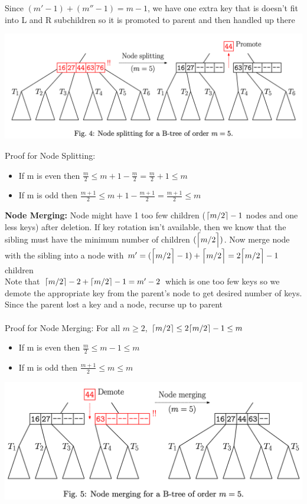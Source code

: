 \documentclass{article}
\DeclarePairedDelimiter{\ceil}{\lceil}{\rceil}
\begin{document}
  Since $(m' - 1) + (m'' - 1) = m - 1$, we have one extra key that is doesn't fit into L and R subchildren so it is promoted to parent and then handled up there
  \begin{center}
  \includegraphics[scale=0.15]{BTreeNodeSplitting}
  \end{center}
  Proof for Node Splitting:
  \begin{itemize}[noitemsep]
  \item If m is even then $\frac{m}{2} \leq m + 1 - \frac{m}{2} = \frac{m}{2} + 1 \leq m$
  \item If m is odd then $\frac{m+1}{2} \leq m + 1 - \frac{m+1}{2} = \frac{m+1}{2} \leq m$ \\
  \end{itemize}
  \textbf{Node Merging: }Node might have 1 too few children ($\ceil{m/2} - 1$ nodes and one less keys) after deletion. If key rotation isn't available, then we know that the sibling must have the minimum number of children $(\ceil[\Big]{m/2})$. Now merge node with the sibling into a node with $m' = (\ceil[\Big]{m/2} - 1) + \ceil[\Big]{m/2} = 2\ceil[\Big]{m/2} - 1$ children\\
  Note that $\ceil{m/2} - 2 + \ceil{m/2} - 1 = m' - 2$ which is one too few keys so we demote the appropriate key from the parent's node to get desired number of keys. \\
  Since the parent lost a key and a node, recurse up to parent\\ \\
  Proof for Node Merging: For all $m \geq 2$, $\ceil{m/2} \leq 2\ceil{m/2} - 1 \leq m$
  \begin{itemize}[noitemsep]
  \item If m is even then $\frac{m}{2} \leq m - 1 \leq m$
  \item If m is odd then $\frac{m+1}{2} \leq m \leq m$
  \end{itemize}
  \begin{center}
  \includegraphics[scale=0.15]{BtreeNodeMerge}
  \end{center}
\end{document}
